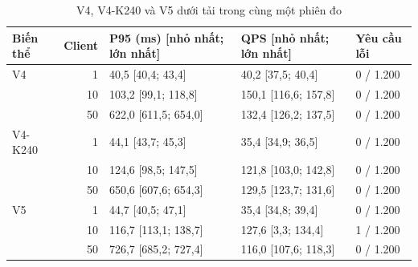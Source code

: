 \begin{table}[htbp]
\centering
\caption[V4, V4-K240 và V5 dưới tải cùng phiên]{V4, V4-K240 và V5 dưới tải trong cùng một phiên đo}\label{tab:v5load}
\begin{tabular}{@{}lrlll@{}}
\toprule
Biến thể & Client & P95 (ms) [nhỏ nhất; lớn nhất] & QPS [nhỏ nhất; lớn nhất] & Yêu cầu lỗi \\
\midrule
V4 & 1 & 40,5 [40,4; 43,4] & 40,2 [37,5; 40,4] & 0 / 1.200 \\
 & 10 & 103,2 [99,1; 118,8] & 150,1 [116,6; 157,8] & 0 / 1.200 \\
 & 50 & 622,0 [611,5; 654,0] & 132,4 [126,2; 137,5] & 0 / 1.200 \\
\midrule
V4-K240 & 1 & 44,1 [43,7; 45,3] & 35,4 [34,9; 36,5] & 0 / 1.200 \\
 & 10 & 124,6 [98,5; 147,5] & 121,8 [103,0; 142,8] & 0 / 1.200 \\
 & 50 & 650,6 [607,6; 654,3] & 129,5 [123,7; 131,6] & 0 / 1.200 \\
\midrule
V5 & 1 & 44,7 [40,5; 47,1] & 35,4 [34,8; 39,4] & 0 / 1.200 \\
 & 10 & 116,7 [113,1; 138,7] & 127,6 [3,3; 134,4] & 1 / 1.200 \\
 & 50 & 726,7 [685,2; 727,4] & 116,0 [107,6; 118,3] & 0 / 1.200 \\
\bottomrule
\end{tabular}
\par{}
\end{table}
